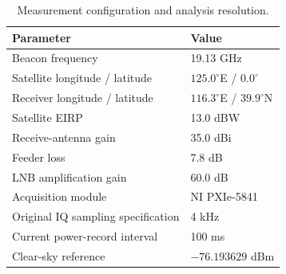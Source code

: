 \begin{table}[!htbp]
\centering
\small
\caption{Measurement configuration and analysis resolution.}
\label{tab:Table01_Measurement_Configuration}
\begin{tabular}{@{}ll@{}}
\toprule
Parameter & Value \\
\midrule
Beacon frequency & 19.13 GHz \\
Satellite longitude / latitude & $125.0^{\circ}$E / $0.0^{\circ}$ \\
Receiver longitude / latitude & $116.3^{\circ}$E / $39.9^{\circ}$N \\
Satellite EIRP & 13.0 dBW \\
Receive-antenna gain & 35.0 dBi \\
Feeder loss & 7.8 dB \\
LNB amplification gain & 60.0 dB \\
Acquisition module & NI PXIe-5841 \\
Original IQ sampling specification & 4 kHz \\
Current power-record interval & 100 ms \\
Clear-sky reference & $-76.193629$ dBm \\
\bottomrule
\end{tabular}
\end{table}
